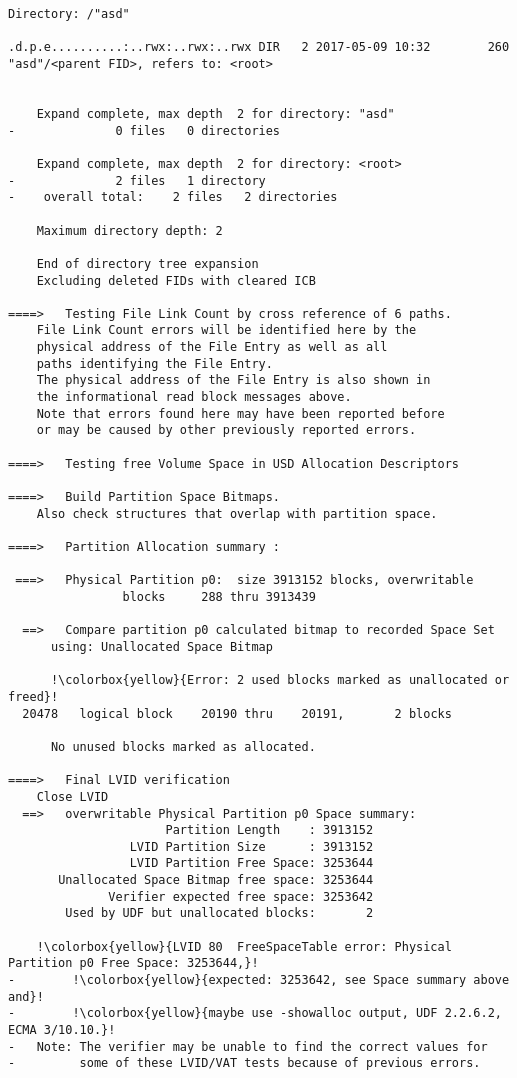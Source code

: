 \begin{lstlisting}
Directory: /"asd"

.d.p.e..........:..rwx:..rwx:..rwx DIR   2 2017-05-09 10:32        260 "asd"/<parent FID>, refers to: <root>


    Expand complete, max depth  2 for directory: "asd"
-              0 files   0 directories

    Expand complete, max depth  2 for directory: <root>
-              2 files   1 directory  
-    overall total:    2 files   2 directories

    Maximum directory depth: 2

    End of directory tree expansion
    Excluding deleted FIDs with cleared ICB

====>   Testing File Link Count by cross reference of 6 paths.
    File Link Count errors will be identified here by the
    physical address of the File Entry as well as all
    paths identifying the File Entry.
    The physical address of the File Entry is also shown in
    the informational read block messages above.
    Note that errors found here may have been reported before
    or may be caused by other previously reported errors.

====>   Testing free Volume Space in USD Allocation Descriptors

====>   Build Partition Space Bitmaps.
    Also check structures that overlap with partition space.

====>   Partition Allocation summary :

 ===>   Physical Partition p0:  size 3913152 blocks, overwritable
                blocks     288 thru 3913439

  ==>   Compare partition p0 calculated bitmap to recorded Space Set
      using: Unallocated Space Bitmap

      !\colorbox{yellow}{Error: 2 used blocks marked as unallocated or freed}!
  20478   logical block    20190 thru    20191,       2 blocks

      No unused blocks marked as allocated.

====>   Final LVID verification
    Close LVID
  ==>   overwritable Physical Partition p0 Space summary:
                      Partition Length    : 3913152
                 LVID Partition Size      : 3913152
                 LVID Partition Free Space: 3253644
       Unallocated Space Bitmap free space: 3253644
              Verifier expected free space: 3253642
        Used by UDF but unallocated blocks:       2

    !\colorbox{yellow}{LVID 80  FreeSpaceTable error: Physical Partition p0 Free Space: 3253644,}!
-        !\colorbox{yellow}{expected: 3253642, see Space summary above and}!
-        !\colorbox{yellow}{maybe use -showalloc output, UDF 2.2.6.2, ECMA 3/10.10.}!
-   Note: The verifier may be unable to find the correct values for
-         some of these LVID/VAT tests because of previous errors.


\end{lstlisting}
